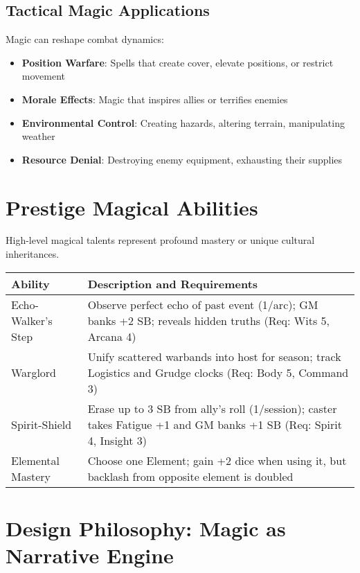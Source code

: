 \subsection*{Tactical Magic Applications}

Magic can reshape combat dynamics:
\begin{itemize}
    \item \textbf{Position Warfare}: Spells that create cover, elevate positions, or restrict movement
    \item \textbf{Morale Effects}: Magic that inspires allies or terrifies enemies
    \item \textbf{Environmental Control}: Creating hazards, altering terrain, manipulating weather
    \item \textbf{Resource Denial}: Destroying enemy equipment, exhausting their supplies
\end{itemize}

\section*{Prestige Magical Abilities}

High-level magical talents represent profound mastery or unique cultural inheritances.

\begin{fatebox}
\begin{tabularx}{\textwidth}{lX}
\toprule
\textbf{Ability} & \textbf{Description and Requirements} \\
\midrule
Echo-Walker's Step & Observe perfect echo of past event (1/arc); GM banks +2 SB; reveals hidden truths (Req: Wits 5, Arcana 4) \\
Warglord & Unify scattered warbands into host for season; track Logistics and Grudge clocks (Req: Body 5, Command 3) \\
Spirit-Shield & Erase up to 3 SB from ally's roll (1/session); caster takes Fatigue +1 and GM banks +1 SB (Req: Spirit 4, Insight 3) \\
Elemental Mastery & Choose one Element; gain +2 dice when using it, but backlash from opposite element is doubled \\
\bottomrule
\end{tabularx}
\end{fatebox}

\section*{Design Philosophy: Magic as Narrative Engine}

